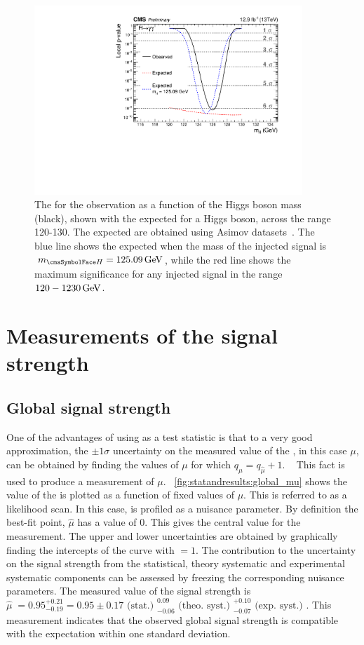 \begin{figure}[ht!]
\centering
\includegraphics[width=0.9\textwidth]{statandresultsFigures/pval13TeV-observed.pdf} 
\caption{The \pvalue for the observation as a function of the Higgs boson mass (black), shown with the expected \pvalue\s for a \SM Higgs boson, across the range 120-130\GeV. The expected \pvalue\s are obtained using Asimov datasets~\cite{}. The blue line shows the expected \pvalue when the mass of the injected signal is $\mH=125.09\GeV$, while the red line shows the maximum significance for any injected signal in the range $120-1230\,\text{Ge\hspace{-.08em}V}$.}

\label{fig:statandresults:pval}
\end{figure}

\section{Measurements of the signal strength}
\subsection{Global signal strength}

One of the advantages of using \DNLL as a test statistic is that to a very good approximation, the $\pm 1 \sigma$ uncertainty on the measured value of the \POI, in this case $\mu$, can be obtained by finding the values of $\mu$ for which $q_{\mu}=q_{\hat{\mu}}+1$. ~\cite{}
This fact is used to produce a measurement of $\mu$. \Fig~\ref{fig:statandresults:global_mu} shows the value of the \DNLL is plotted as a function of fixed values of $\mu$. This is referred to as a likelihood scan. In this case, \mH is profiled as a nuisance parameter. By definition the best-fit point, $\hat{\mu}$ has a \DNLL value of $0$. This gives the central value for the measurement. The upper and lower uncertainties are obtained by graphically finding the intercepts of the curve with \DNLL$=1$. 
The contribution to the uncertainty on the signal strength from the statistical, theory systematic and experimental systematic components can be assessed by freezing the corresponding nuisance parameters. 
The measured value of the signal strength is $\hat{\mu}􏰋 = 0.95^{+0.21}_{-0.19} = 0.95 \pm 0.17 \text{ (stat.) } ^{0.09}_{-0.06} \text{ (theo. syst.) } ^{+0.10}_{-0.07} \text{ (exp. syst.) } $. This measurement indicates that the observed global signal strength is compatible with the \SM expectation within one standard deviation.

